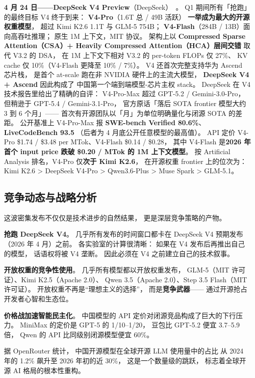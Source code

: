 \textbf{4 月 24 日——DeepSeek V4 Preview}（DeepSeek）~\cite{deepseekv4,artificialanalysisv4}。
Q1 期间所有「抢跑」的最终目标 V4 终于到来：
\textbf{V4-Pro}（1.6T 总 / 49B 活跃）
\textbf{一举成为最大的开源权重模型}，
超过 Kimi K2.6 1.1T 与 GLM-5 754B；
\textbf{V4-Flash}（284B / 13B）面向高吞吐推理；
原生 1M 上下文，MIT 协议。
架构上以 \textbf{Compressed Sparse Attention（CSA）+
Heavily Compressed Attention（HCA）层间交错}
取代 V3.2 的 DSA，
在 1M 上下文下相对 V3.2 的 per-token FLOPs 仅 27\%、
KV cache 仅 10\%（V4-Flash 更降至 10\% / 7\%）。
V4 还首次完整支持华为 Ascend 芯片栈，
是首个 at-scale 跑在非 NVIDIA 硬件上的主流大模型，
\textbf{DeepSeek V4 + Ascend} 因此构成了
中国第一个端到端模型-芯片主权 stack。
DeepSeek 在 V4 技术报告里给出了精确的自评：
V4-Pro-Max 超过 GPT-5.2 / Gemini-3.0-Pro，
但稍逊于 GPT-5.4 / Gemini-3.1-Pro，
官方原话「落后 SOTA frontier 模型大约 3 到 6 个月」——
首次有开源团队以「月」为单位明确量化与闭源 SOTA 的差距。
公开基准上 V4-Pro-Max 报 \textbf{SWE-bench Verified 80.6\%}、\textbf{LiveCodeBench 93.5}
（后者为 4 月底公开任意模型的最高值）。
API 定价 V4-Pro \$1.74 / \$3.48 per MTok、V4-Flash \$0.14 / \$0.28，
其中 V4-Flash 是\textbf{2026 年首个 input price 跌破 \$0.20 / MTok 的 1M 上下文模型}。
按 Artificial Analysis 排名，V4-Pro 仅\textbf{次于 Kimi K2.6}，
在开源权重 frontier 上的位次为：Kimi K2.6 > DeepSeek V4-Pro > Qwen3.6-Plus > Muse Spark > GLM-5.1。

\subsection{竞争动态与战略分析}

这波密集发布不仅仅是技术进步的自然结果，
更是深层竞争策略的产物。

\textbf{抢跑 DeepSeek V4}。
几乎所有发布的时间窗口都卡在
DeepSeek V4 预期发布（2026 年 4 月）之前。
各实验室的计算很清晰：
如果在 V4 发布后再推出自己的模型，
话语权将被 V4 垄断。
因此必须在 V4 之前建立自己的技术叙事。

\textbf{开放权重的竞争性使用}。
几乎所有模型都以开放权重发布，
GLM-5（MIT 许可证）、Kimi K2.5（Apache 2.0）、
Qwen 3.5（Apache 2.0）、Step 3.5 Flash（MIT 许可证）。
开放权重不再是“理想主义的选择”，
而是\textbf{竞争武器}——
通过开源抢占开发者心智和生态位。

\textbf{价格战加速智能民主化}。
中国模型的 API 定价对闭源竞品构成了巨大的下行压力。
MiniMax 的定价是 GPT-5 的 1/10--1/20，
豆包比 GPT-5.2 便宜 3.7--5.9 倍，
Qwen 的 API 比同级别闭源模型便宜 60\%。

据 OpenRouter 统计，
中国开源模型在全球开源 LLM 使用量中的占比
从 2024 年的 1.2\% 飙升至 2026 年初的近 30\%，
这是一个数量级的跳跃，
标志着全球开源 AI 格局的根本性重构。

